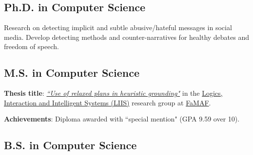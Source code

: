 \documentclass[a4paper]{MagicalCV}
\begin{document}



\begin{minipage}[t]{0.36\textwidth} 


\subsection{Ph.D. in Computer Science}
\vspace{\topsep} %
Research on detecting implicit and subtle abusive/hateful messages in social media. Develop detecting methods and counter-narratives for healthy debates and freedom of speech.
\sectionsep

\subsection{M.S. in Computer Science}
\textbf{Thesis title}: \href{https://rdu.unc.edu.ar/handle/11086/22979}{\textit{``Use of relaxed plans in heuristic grounding"}} in the \href{https://liisgroup.github.io/}{Logics, Interaction and Intelligent Systems (LIIS)} research group at \href{https://www.famaf.unc.edu.ar/}{FaMAF}.

\textbf{Achievements}: Diploma awarded with ``special mention" (GPA 9.59 over 10).
\sectionsep

\subsection{B.S. in Computer Science}


\end{minipage}
\end{document}
